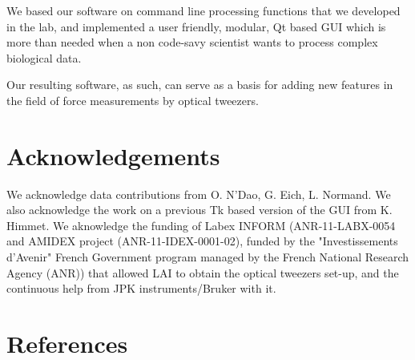 \documentclass[a4paper]{article}
\begin{document}
We based our software on command line processing functions that we
developed in the lab, and implemented a user friendly, modular, Qt based
GUI which is more than needed when a non code-savy scientist wants to
process complex biological data.

Our resulting software, as such, can serve as a basis for adding new
features in the field of force measurements by optical tweezers.



\section{Acknowledgements}\label{acknowledgements}

We acknowledge data contributions from O. N'Dao, G. Eich, L. Normand. We
also acknowledge the work on a previous Tk based version of the GUI from
K. Himmet. We aknowledge the funding of Labex INFORM (ANR-11-LABX-0054
and AMIDEX project (ANR-11-IDEX-0001-02), funded by the "Investissements d'Avenir" French Government program managed by the
French National Research Agency (ANR)) that allowed LAI to obtain the
optical tweezers set-up, and the continuous help from JPK
instruments/Bruker with it.

\section{References}\label{references}
\end{document}
